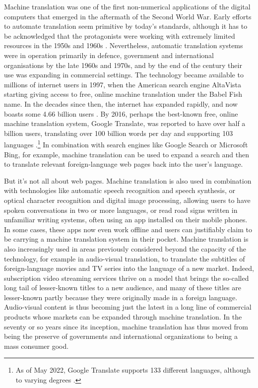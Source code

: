 \documentclass[output=paper]{langscibook}
\begin{document}
Machine translation was one of the first non-numerical applications of the digital computers that emerged in the aftermath of the Second World War. Early efforts to automate translation seem primitive by today's standards, although it has to be acknowledged that the protagonists were working with extremely limited resources in the 1950s and 1960s \citep{Hutchins2000}. Nevertheless, automatic translation systems were in operation primarily in defence, government and international organisations by the late 1960s and 1970s, and by the end of the century their use was expanding in commercial settings. The technology became available to millions of internet users in 1997, when the American search engine AltaVista starting giving access to free, online machine translation under the Babel Fish name. In the decades since then, the internet has expanded rapidly, and now boasts some 4.66 billion users \citep{Johnson2021}. By 2016, perhaps the best-known free, online machine translation system, Google Translate, was reported to have over half a billion users, translating over 100 billion words per day and supporting 103 languages \citep{Turovsky2016}.\footnote{As of May 2022, Google Translate supports 133 different languages, although to varying degrees \citep{Caswell2022}.} In combination with search engines like Google Search or Microsoft Bing, for example, machine translation can be used to expand a search and then to translate relevant foreign-language web pages back into the user's language.

But it's not all about web pages. Machine translation is also used in combination with technologies like automatic speech recognition and speech synthesis, or optical character recognition and digital image processing, allowing users to have spoken conversations in two or more languages, or read road signs written in unfamiliar writing systems, often using an app installed on their mobile phones. In some cases, these apps now even work offline and users can justifiably claim to be carrying a machine translation system in their pocket. Machine translation is also increasingly used in areas previously considered beyond the capacity of the technology, for example in audio-visual translation, to translate the subtitles of foreign-language movies and TV series into the language of a new market. Indeed, subscription video streaming services thrive on a model that brings the so-called long tail of lesser-known titles to a new audience, and many of these titles are lesser-known partly because they were originally made in a foreign language. Audio-visual content is thus becoming just the latest in a long line of commercial products whose markets can be expanded through machine translation. In the seventy or so years since its inception, machine translation has thus moved from being the preserve of governments and international organizations to being a mass consumer good. 
\end{document}
